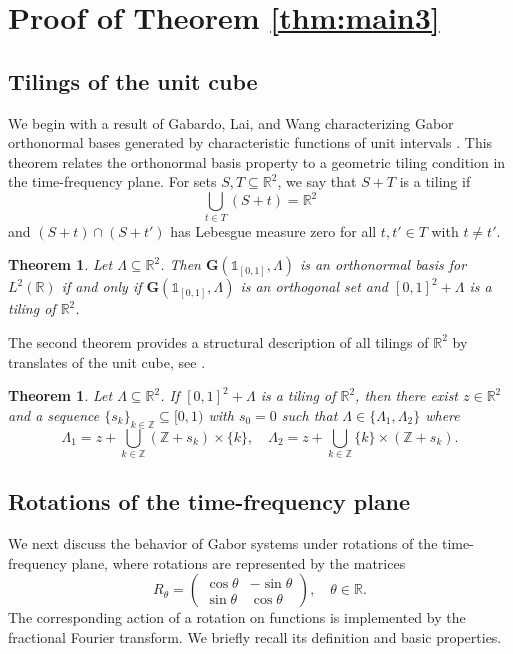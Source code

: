 \documentclass[reqno,a4paper,12pt]{amsart}
\numberwithin{equation}{section}
\newtheorem{theorem}[definition]{Theorem}
\def\Z{{\mathbb Z}}
\def\R{{\mathbb R}}
\newcommand{\lt}{{L^2(\R)}}
\newcommand\1{\mathds{1}}
\begin{document}
\section{Proof of Theorem \ref{thm:main3}}

\subsection{Tilings of the unit cube}
We begin with a result of Gabardo, Lai, and Wang characterizing Gabor orthonormal bases generated by characteristic functions of unit intervals \cite[Theorem 1.2]{GLW15}. This theorem relates the orthonormal basis property to a geometric tiling condition in the time-frequency plane. For sets $S,T \subseteq \R^2$, we say that $S+T$ is a tiling if 
$$
\bigcup_{t \in T} (S+t) = \R^2
$$
and $(S+t) \cap (S+t')$ has Lebesgue measure zero for all $t,t' \in T$ with $t \neq t'$.

\begin{theorem}\label{thm:1}
    Let $\Lambda \subseteq \R^2$. Then $\mathbf{G}(\1_{[0,1]},\Lambda)$ is an orthonormal basis for $\lt$ if and only if $\mathbf{G}(\1_{[0,1]},\Lambda)$ is an orthogonal set and $[0,1]^2+\Lambda$ is a tiling of $\R^2$.
\end{theorem}

The second theorem provides a structural description of all tilings of $\R^2$ by translates of the unit cube, see \cite[Proposition 3.2]{GLW15}.

\begin{theorem}\label{thm:2}
    Let $\Lambda \subseteq \R^2$. If $[0,1]^2+\Lambda$ is a tiling of $\R^2$, then there exist $z \in \R^2$ and a sequence $\{ s_k \}_{k \in \Z} \subseteq [0,1)$ with $s_0=0$ such that $\Lambda \in \{ \Lambda_1, \Lambda_2 \}$ where
    $$
    \Lambda_1 = z + \bigcup_{k \in \Z} (\Z + s_k) \times \{ k \}, \quad \Lambda_2 = z + \bigcup_{k \in \Z} \{ k \} \times (\Z + s_k).
    $$
\end{theorem}

\subsection{Rotations of the time-frequency plane}

We next discuss the behavior of Gabor systems under rotations of the time-frequency plane, where rotations are represented by the matrices
\begin{equation}\label{def:rotation_matrix}
    R_\theta = \begin{pmatrix}
\cos \theta & -\sin \theta\\
\sin\theta & \cos\theta
\end{pmatrix}, \quad \theta \in \R.
\end{equation}
The corresponding action of a rotation on functions is implemented by the fractional Fourier transform. We briefly recall its definition and basic properties.
\end{document}
